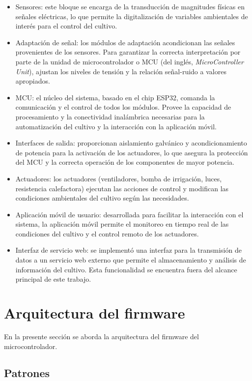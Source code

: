\begin{itemize}
	\item Sensores: este bloque se encarga de la transducción de magnitudes físicas en señales eléctricas, lo que permite la digitalización de variables ambientales de interés para el control del cultivo.
	\item Adaptación de señal: los módulos de adaptación acondicionan las señales provenientes de los sensores. Para garantizar la correcta interpretación por parte de la unidad de microcontrolador o MCU (del inglés, \textit{MicroController Unit}), ajustan los niveles de tensión y la relación señal-ruido a valores apropiados.
	\item MCU: el núcleo del sistema, basado en el chip ESP32, comanda la comunicación y el control de todos los módulos. Provee la capacidad de procesamiento y la conectividad inalámbrica necesarias para la automatización del cultivo y la interacción con la aplicación móvil.
	\item Interfaces de salida: proporcionan aislamiento galvánico y acondicionamiento de potencia para la activación de los actuadores, lo que asegura la protección del MCU y la correcta operación de los componentes de mayor potencia.
	\item Actuadores: los actuadores (ventiladores, bomba de irrigación, luces, resistencia calefactora) ejecutan las acciones de control y modifican las condiciones ambientales del cultivo según las necesidades.
	\item Aplicación móvil de usuario: desarrollada para facilitar la interacción con el sistema, la aplicación móvil permite el monitoreo en tiempo real de las condiciones del cultivo y el control remoto de los actuadores.
	\item Interfaz de servicio web: se implementó una interfaz para la transmisión de datos a un servicio web externo que permite el almacenamiento y análisis de información del cultivo. Esta funcionalidad se encuentra fuera del alcance principal de este trabajo.

\end{itemize}

\section{Arquitectura del firmware}

En la presente sección se aborda la arquitectura del firmware del microcontrolador.

\subsection{Patrones}

